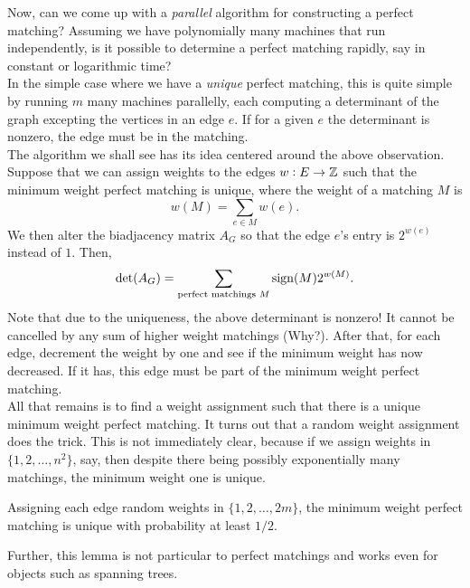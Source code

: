 		Now, can we come up with a \emph{parallel} algorithm for constructing a perfect matching? Assuming we have polynomially many machines that run independently, is it possible to determine a perfect matching rapidly, say in constant or logarithmic time?\\

		In the simple case where we have a \emph{unique} perfect matching, this is quite simple by running $m$ many machines parallelly, each computing a determinant of the graph excepting the vertices in an edge $e$. If for a given $e$ the determinant is nonzero, the edge must be in the matching.\\
		The algorithm we shall see has its idea centered around the above observation.\\

		Suppose that we can assign weights to the edges $w : E \to \mathbb{Z}$ such that the minimum weight perfect matching is unique, where the weight of a matching $M$ is
		\[ w(M) = \sum_{e \in M} w(e). \]
		We then alter the biadjacency matrix $A_G$ so that the edge $e$'s entry is $2^{w(e)}$ instead of $1$. Then,
		\[ \det(A_G) = \sum_{\text{perfect matchings $M$}} \operatorname{sign}(M) 2^{w(M)}. \]
		Note that due to the uniqueness, the above determinant is nonzero! It cannot be cancelled by any sum of higher weight matchings (Why?). After that, for each edge, decrement the weight by one and see if the minimum weight has now decreased. If it has, this edge must be part of the minimum weight perfect matching.\\
		All that remains is to find a weight assignment such that there is a unique minimum weight perfect matching. It turns out that a random weight assignment does the trick. This is not immediately clear, because if we assign weights in $\{1,2,\ldots,n^2\}$, say, then despite there being possibly exponentially many matchings, the minimum weight one is unique.

		\begin{flem}
			Assigning each edge random weights in $\{1,2,\ldots,2m\}$, the minimum weight perfect matching is unique with probability at least $1/2$.
		\end{flem}
		Further, this lemma is not particular to perfect matchings and works even for objects such as spanning trees.